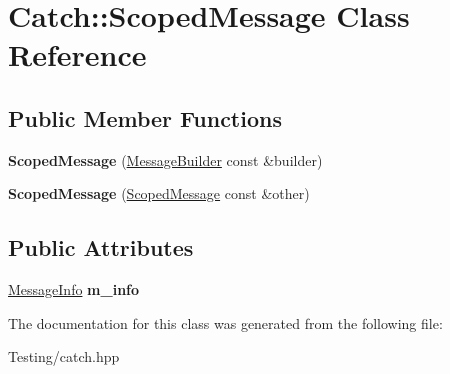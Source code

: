 \hypertarget{class_catch_1_1_scoped_message}{\section{Catch\-:\-:Scoped\-Message Class Reference}
\label{class_catch_1_1_scoped_message}
}
\subsection*{Public Member Functions}
\begin{DoxyCompactItemize}
\item 
\hypertarget{class_catch_1_1_scoped_message_a5cc59f0f2ebe840e6607f83004d49a17}{{\bfseries Scoped\-Message} (\hyperlink{struct_catch_1_1_message_builder}{Message\-Builder} const \&builder)}\label{class_catch_1_1_scoped_message_a5cc59f0f2ebe840e6607f83004d49a17}

\item 
\hypertarget{class_catch_1_1_scoped_message_ae03a17fd47220d563d4abc73e7518e29}{{\bfseries Scoped\-Message} (\hyperlink{class_catch_1_1_scoped_message}{Scoped\-Message} const \&other)}\label{class_catch_1_1_scoped_message_ae03a17fd47220d563d4abc73e7518e29}

\end{DoxyCompactItemize}
\subsection*{Public Attributes}
\begin{DoxyCompactItemize}
\item 
\hypertarget{class_catch_1_1_scoped_message_ae6e1476f389cc6e1586f033b3747b27b}{\hyperlink{struct_catch_1_1_message_info}{Message\-Info} {\bfseries m\-\_\-info}}\label{class_catch_1_1_scoped_message_ae6e1476f389cc6e1586f033b3747b27b}

\end{DoxyCompactItemize}


The documentation for this class was generated from the following file\-:\begin{DoxyCompactItemize}
\item 
Testing/catch.\-hpp\end{DoxyCompactItemize}
